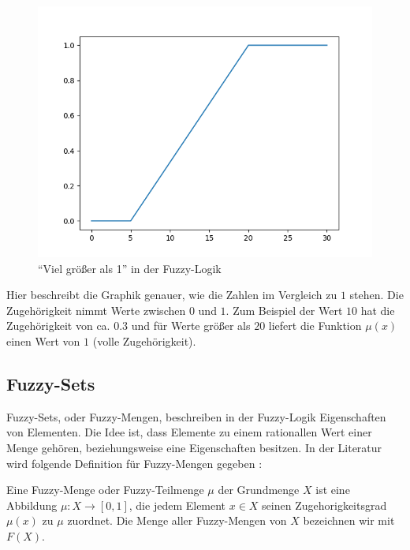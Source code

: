 \begin{figure}[htbp]
	\centering
	\includegraphics[scale=0.5]{images/fuzz_logic.png}
	\caption{``Viel größer als 1'' in der Fuzzy-Logik}\label{fuzzy_dar}
\end{figure}

Hier beschreibt die Graphik genauer, wie die Zahlen im Vergleich zu $1$ stehen. Die Zugehörigkeit nimmt Werte zwischen $0$ und $1$. Zum Beispiel der Wert $10$ hat die Zugehörigkeit von ca. $0.3$ und für Werte größer als $20$ liefert die Funktion $\mu (x)$ einen Wert von $1$ (volle Zugehörigkeit).


\subsection{Fuzzy-Sets}\label{fs_section}%
Fuzzy-Sets, oder Fuzzy-Mengen, beschreiben in der Fuzzy-Logik Eigenschaften von Elementen. Die Idee ist, dass Elemente zu einem rationallen Wert einer Menge gehören, beziehungsweise eine Eigenschaften besitzen. In der Literatur wird folgende Definition für Fuzzy-Mengen gegeben \cite{CIKruse:15}:

\begin{definition}
	Eine Fuzzy-Menge oder Fuzzy-Teilmenge $\mu$ der Grundmenge $X$ ist eine
	Abbildung $\mu : X \rightarrow [0, 1]$, die jedem Element $x \in X$ seinen Zugehorigkeitsgrad $\mu(x)$ zu
$\mu$ zuordnet. Die Menge aller Fuzzy-Mengen von $X$ bezeichnen wir mit $F(X)$. \cite{CIKruse:15}
\end{definition}

